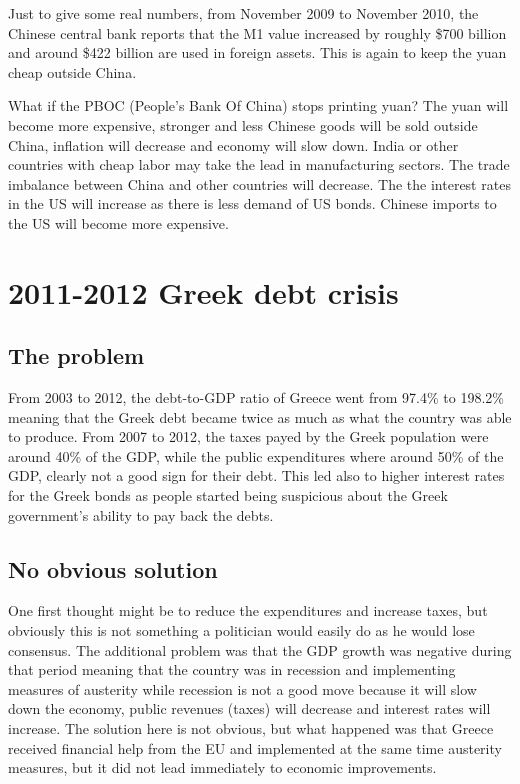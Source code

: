 Just to give some real numbers, from November 2009 to November 2010, the Chinese central bank reports that the M1 value increased by roughly \$700 billion and around \$422 billion are used in foreign assets. This is again to keep the yuan cheap outside China.

What if the PBOC (People's Bank Of China) stops printing yuan? The yuan will become more expensive, stronger and less Chinese goods will be sold outside China, inflation will decrease and economy will slow down. India or other countries with cheap labor may take the lead in manufacturing sectors. The trade imbalance between China and other countries will decrease. The the interest rates in the US will increase as there is less demand of US bonds. Chinese imports to the US will become more expensive.

\section{2011-2012 Greek debt crisis}

\subsection{The problem}
From 2003 to 2012, the debt-to-GDP ratio of Greece went from 97.4\% to 198.2\% meaning that the Greek debt became twice as much as what the country was able to produce. From 2007 to 2012, the taxes payed by the Greek population were around 40\% of the GDP, while the public expenditures where around 50\% of the GDP, clearly not a good sign for their debt. This led also to higher interest rates for the Greek bonds as people started being suspicious about the Greek government's ability to pay back the debts. 

\subsection{No obvious solution}
One first thought might be to reduce the expenditures and increase taxes, but obviously this is not something a politician would easily do as he would lose consensus. The additional problem was that the GDP growth was negative during that period meaning that the country was in recession and implementing measures of austerity while recession is not a good move because it will slow down the economy, public revenues (taxes) will decrease and interest rates will increase. The solution here is not obvious, but what happened was that Greece received financial help from the EU and implemented at the same time austerity measures, but it did not lead immediately to economic improvements.

